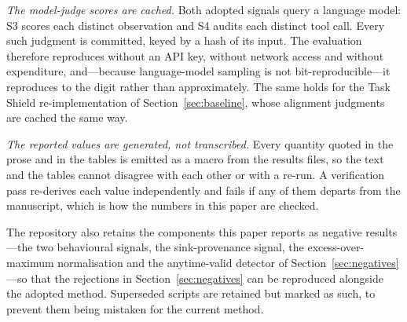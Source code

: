 \documentclass[preprint,12pt,authoryear]{elsarticle}
\theoremstyle{definition}
\begin{document}
\emph{The model-judge scores are cached.} Both adopted signals query a language
model: S3 scores each distinct observation and S4 audits each distinct tool call.
Every such judgment is committed, keyed by a hash of its input. The evaluation
therefore reproduces without an API key, without network access and without
expenditure, and---because language-model sampling is not bit-reproducible---it
reproduces to the digit rather than approximately. The same holds for the Task
Shield re-implementation of Section~\ref{sec:baseline}, whose alignment judgments
are cached the same way.

\emph{The reported values are generated, not transcribed.} Every quantity quoted
in the prose and in the tables is emitted as a macro from the results files, so
the text and the tables cannot disagree with each other or with a re-run. A
verification pass re-derives each value independently and fails if any of them
departs from the manuscript, which is how the numbers in this paper are checked.

The repository also retains the components this paper reports as negative
results---the two behavioural signals, the sink-provenance signal, the
excess-over-maximum normalisation and the anytime-valid detector of
Section~\ref{sec:negatives}---so that the rejections in Section~\ref{sec:negatives}
can be reproduced alongside the adopted method. Superseded scripts are retained
but marked as such, to prevent them being mistaken for the current method.



\end{document}
